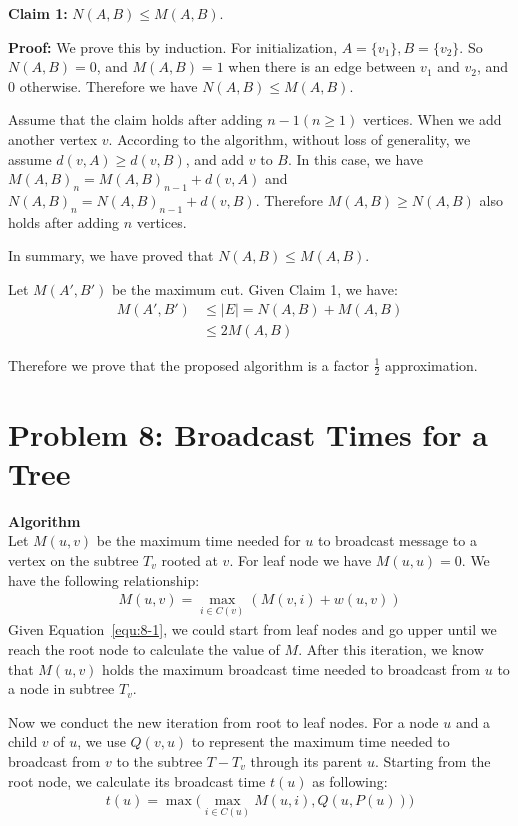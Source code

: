 \documentclass{article}
\newcommand{\Algorithm}{\textbf{Algorithm} \vspace{0.2cm}\\}
\begin{document}
\textbf{Claim 1:} $N(A, B) \leq M(A, B)$.

\textbf{Proof:}
We prove this by induction. For initialization, $A = \{v_1\}, B = \{v_2\}$. So $N(A, B) = 0$, and 
$M(A, B) = 1$ when there is an edge between $v_1$ and $v_2$, and $0$ otherwise. Therefore we have
$N(A, B) \leq M(A, B)$.

Assume that the claim holds after adding $n - 1 (n \geq 1)$ vertices. When we add another vertex
$v$. According to the algorithm, without loss of generality, we assume $d(v, A) \geq d(v, B)$, and
add $v$ to $B$. In
this case, we have $M(A, B)_n = M(A, B)_{n-1} + d(v, A)$ and $N(A, B)_n = N(A, B)_{n-1} + d(v, B)$.
Therefore $M(A, B) \geq N(A, B)$ also holds after adding $n$ vertices.

In summary, we have proved that $N(A, B) \leq M(A, B)$.

Let $M(A', B')$ be the maximum cut. Given Claim 1, we have:
\begin{align}
M(A', B') & \leq |E| = N(A, B) + M(A, B)\\
  & \leq 2 M(A, B)
\end{align}

Therefore we prove that the proposed algorithm is a factor $\frac{1}{2}$ approximation.

\section*{Problem 8: Broadcast Times for a Tree}
\Algorithm
Let $M(u, v)$ be the maximum time needed for $u$ to broadcast message to a vertex on the subtree   
$T_v$ rooted at $v$. For leaf node we have $M(u, u) = 0$. We have the
following relationship:
\begin{align}
  M(u, v) = \max_{i \in C(v)} (M(v, i) + w(u, v))
  \label{equ:8-1}
\end{align}
Given Equation~\ref{equ:8-1}, we could start from leaf nodes and go upper until we reach the root
node to calculate the value of $M$. After this iteration, we know that $M(u, v)$ holds the maximum
broadcast time needed to broadcast from $u$ to a node in subtree $T_v$.

Now we conduct the new iteration from root to leaf nodes. For a node $u$ and a child $v$ of $u$, 
we use $Q(v, u)$  to represent the maximum time needed to broadcast from $v$ to the subtree $T -
T_v$ through its parent $u$. Starting from the root node, we calculate its broadcast time $t(u)$ as following:
\begin{align}
  t(u) = \max\big(\max_{i \in C(u)} M(u, i), Q(u, P(u)) \big)
\end{align}
\end{document}
